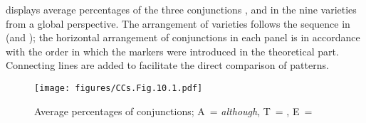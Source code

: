  displays average percentages of the three conjunctions ,  and  in the nine varieties from a global perspective. The arrangement of varieties follows the sequence in  (and ); the horizontal arrangement of conjunctions in each panel is in accordance with the order in which the markers were introduced in the theoretical part. Connecting lines are added to facilitate the direct comparison of patterns.

\begin{figure}
\texttt{[image: figures/CCs.Fig.10.1.pdf]}
\caption{\label{bkm:Ref59787429}\label{fig:10.1}Average percentages of conjunctions; A~= \textit{although}, T~= , E~= }
\end{figure}

